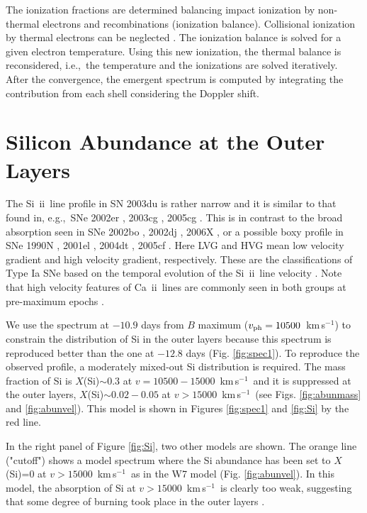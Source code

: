 \documentclass[usegraphicx,usenatbib]{mn2e}
\newcommand{\kms}{\mbox{\,km\,s$^{-1}$}}
\newcommand{\eg}{e.g.,\ }
\newcommand{\ie}{i.e.,\ }
\newcommand{\SiII}{Si~{\sc ii}}
\newcommand{\CaII}{Ca~{\sc ii}}
\begin{document}
The ionization fractions are determined balancing impact ionization
by non-thermal electrons and recombinations (ionization balance). Collisional
ionization by thermal electrons can be neglected \citep{ruizlapuente92}. The
ionization balance is solved for a given electron temperature. Using this new
ionization, the thermal balance is reconsidered, \ie the temperature and the
ionizations are solved iteratively. After the convergence, the emergent spectrum
is computed by integrating the contribution from each shell considering the
Doppler shift.


\section{Silicon Abundance at the Outer Layers}
\label{app:Si}

The \SiII\ line profile in SN 2003du is rather narrow and it is similar to that
found in, \eg SNe 2002er \citep[Fig. \ref{fig:Si}, HVG,][]{kotak05}, 2003cg
\citep[LVG,][]{eliasrosa06}, 2005cg \citep[LVG,][]{quimby06}. 
This is in contrast to the broad
absorption seen in SNe 2002bo \citep[Fig. \ref{fig:Si}, HVG,][]{benetti04}, 
2002dj \citep[HVG,][]{pignata08}, 
2006X \citep[HVG,][]{wang0806X,yamanaka0906X}, or a possible boxy
profile in SNe 1990N \citep[LVG,][]{leibundgut9190N}, 
2001el \citep[LVG,][]{mattila05}, 2004dt
\citep[HVG,][]{altavilla07}, 
2005cf \citep[Fig. \ref{fig:Si}, LVG,][]{garavini07,wang0905cf}.
Here LVG and HVG mean low velocity gradient and high velocity gradient,
respectively. These are the classifications of Type Ia SNe 
based on the temporal evolution of the \SiII\ line velocity \citep{benetti05}.
Note that high velocity features of \CaII\ lines 
are commonly seen in both groups
at pre-maximum epochs \citep{mazzali05Ia}.

We use the spectrum at $-10.9$ days from $B$ maximum ($v_{\rm ph}=10500$ \kms) 
to constrain the distribution of Si in the outer layers because this spectrum is
reproduced better than the one at $-12.8$ days (Fig. \ref{fig:spec1}).
To reproduce the observed profile, a moderately mixed-out Si distribution is
required. The mass fraction of Si is $X$(Si)$\sim 0.3$ at $v=10500-15000$ \kms\
and it is suppressed at the outer layers, $X$(Si)$\sim 0.02-0.05$ at $v>15000$
\kms\ (see Figs. \ref{fig:abunmass} and \ref{fig:abunvel}). This model is shown
in Figures \ref{fig:spec1} and \ref{fig:Si} by the red line.

In the right panel of Figure \ref{fig:Si}, two other models are shown.  The
orange line ("cutoff") shows a model spectrum where the Si abundance has been
set to $X$(Si)=0 at $v>15000$ \kms\ as in the W7 model (Fig. \ref{fig:abunvel}).
In this model, the absorption of Si at $v>15000$ \kms\ is clearly too weak,
suggesting that some degree of burning took place in the outer layers
\citep{gerardy04}.
\end{document}
